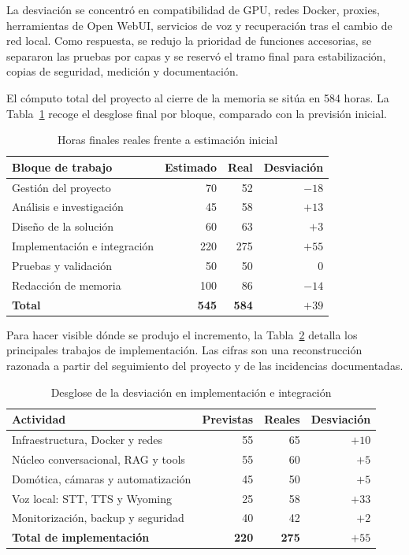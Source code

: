 La desviación se concentró en compatibilidad de GPU, redes Docker, proxies, herramientas de Open WebUI, servicios de voz y recuperación tras el cambio de red local. Como respuesta, se redujo la prioridad de funciones accesorias, se separaron las pruebas por capas y se reservó el tramo final para estabilización, copias de seguridad, medición y documentación.

El cómputo total del proyecto al cierre de la memoria se sitúa en 584 horas. La Tabla~\ref{tab:horas-reales-finales} recoge el desglose final por bloque, comparado con la previsión inicial.

\begin{table}[H]
  \centering
  \caption{Horas finales reales frente a estimación inicial}
  \label{tab:horas-reales-finales}
  \begin{tabular}{lrrr}
    \toprule
    Bloque de trabajo & Estimado & Real & Desviación \\
    \midrule
    Gestión del proyecto         & 70  & 52  & $-18$ \\
    Análisis e investigación     & 45  & 58  & $+13$ \\
    Diseño de la solución        & 60  & 63  & $+3$  \\
    Implementación e integración & 220 & 275 & $+55$ \\
    Pruebas y validación         & 50  & 50  & $0$  \\
    Redacción de memoria         & 100 & 86  & $-14$ \\
    \midrule
    \textbf{Total} & \textbf{545} & \textbf{584} & \textbf{$+39$} \\
    \bottomrule
  \end{tabular}
\end{table}

Para hacer visible dónde se produjo el incremento, la Tabla~\ref{tab:desviacion-implementacion} detalla los principales trabajos de implementación. Las cifras son una reconstrucción razonada a partir del seguimiento del proyecto y de las incidencias documentadas.

\begin{table}[H]
  \centering
  \caption{Desglose de la desviación en implementación e integración}
  \label{tab:desviacion-implementacion}
  \small
  \begin{tabularx}{\textwidth}{Xrrr}
    \toprule
    Actividad & Previstas & Reales & Desviación \\
    \midrule
    Infraestructura, Docker y redes & 55 & 65 & $+10$ \\
    Núcleo conversacional, RAG y tools & 55 & 60 & $+5$ \\
    Domótica, cámaras y automatización & 45 & 50 & $+5$ \\
    Voz local: STT, TTS y Wyoming & 25 & 58 & $+33$ \\
    Monitorización, backup y seguridad & 40 & 42 & $+2$ \\
    \midrule
    \textbf{Total de implementación} & \textbf{220} & \textbf{275} & \textbf{$+55$} \\
    \bottomrule
  \end{tabularx}
\end{table}

